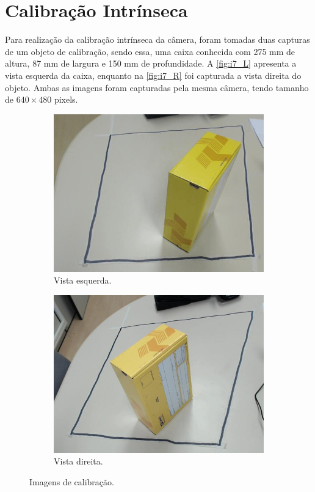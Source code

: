 
\section{Calibração Intrínseca}

Para realização da calibração intrínseca da câmera, foram tomadas duas capturas de um objeto de calibração, sendo essa, uma caixa conhecida com 275 mm de altura, 87 mm de largura e 150 mm de profundidade. A \autoref{fig:i7_L} apresenta a vista esquerda da caixa, enquanto na \autoref{fig:i7_R} foi capturada a vista direita do objeto. Ambas as imagens foram capturadas pela mesma câmera, tendo tamanho de $640 \times 480$ pixels.

\begin{figure}[H]
	\centering
	\begin{subfigure}[H]{0.49\textwidth}
		\includegraphics[width = \textwidth]{../../data/i7_L.jpg}
		\caption{Vista esquerda.}
		\label{fig:i7_L}
	\end{subfigure}
	\begin{subfigure}[H]{0.49\textwidth}
		\centering
		\includegraphics[width = \textwidth]{../../data/i7_R.jpg}
		\caption{Vista direita.}
		\label{fig:i7_R}
	\end{subfigure}
	\caption{Imagens de calibração.}
\end{figure}

